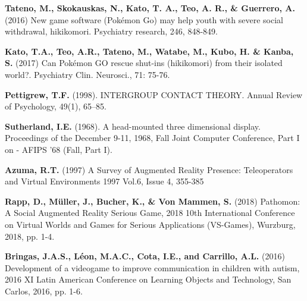\documentclass[runningheads]{llncs}
\begin{document}
\begin{thebibliography}{8}
 	\textbf{Tateno, M., Skokauskas, N., Kato, T. A., Teo, A. R., \& Guerrero, A.} (2016) New game software (Pokémon Go) may help youth with severe social withdrawal, hikikomori. Psychiatry research, 246, 848-849. 

 \textbf{Kato, T.A., Teo, A.R., Tateno, M., Watabe, M., Kubo, H. \& Kanba, S.} (2017) Can Pokémon GO rescue shut-ins (hikikomori) from their isolated world?. Psychiatry Clin. Neurosci., 71: 75-76. 

 \textbf{Pettigrew, T.F.} (1998). INTERGROUP CONTACT THEORY. Annual Review of Psychology, 49(1), 65–85. 

 \textbf{Sutherland, I.E.} (1968). A head-mounted three dimensional display. Proceedings of the December 9-11, 1968, Fall Joint Computer Conference, Part I on - AFIPS ’68 (Fall, Part I). 

 \textbf{Azuma, R.T.} (1997) A Survey of Augmented Reality
Presence: Teleoperators and Virtual Environments 1997 Vol.6, Issue 4, 355-385 

 \textbf{Rapp, D., Müller, J., Bucher, K., \& Von Mammen, S.} (2018) Pathomon: A Social Augmented Reality Serious Game, 2018 10th International Conference on Virtual Worlds and Games for Serious Applications (VS-Games), Wurzburg, 2018, pp. 1-4. 

 \textbf{Bringas, J.A.S., Léon, M.A.C., Cota, I.E., and Carrillo, A.L.} (2016) Development of a videogame to improve communication in children with autism, 2016 XI Latin American Conference on Learning Objects and Technology, San Carlos, 2016, pp. 1-6. 




\end{thebibliography}
\end{document}
